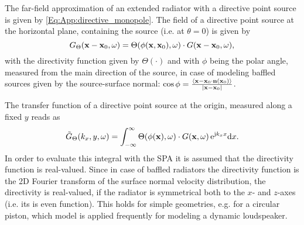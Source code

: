 The far-field approximation of an extended radiator with a directive point source is given by \eqref{Eq:App:directive_monopole}.
The field of a directive point source at the horizontal plane, containing the source (i.e. at $\theta = 0$) is given by
\begin{equation}
G_{\Theta}(\mathbf{x}-\mathbf{x}_0,\omega) = \Theta(\phi(\mathbf{x},\mathbf{x}_0),\omega) \cdot
G(\mathbf{x}-\mathbf{x}_0,\omega),
\end{equation}
with the directivity function given by $\Theta(\cdot)$ and with $\phi$ being the polar angle, measured from the main direction of the source, in case of modeling baffled sources given by the source-surface normal: $\cos \phi = \frac{\left< \mathbf{x}-\mathbf{x}_0 \cdot \mathbf{n}(\mathbf{x}_0) \right>}{|\mathbf{x}-\mathbf{x}_0|}$.

The transfer function of a directive point source at the origin, measured along a fixed $y$ reads as 
\begin{equation}
\tilde{G}_{\Theta}(k_x,y,\omega) = \int_{-\infty}^{\infty} \Theta(\phi(\mathbf{x}),\omega) \cdot
G(\mathbf{x},\omega) \, \mathrm{e}^{\mathrm{j} k_x x} \mathrm{d} x.
\end{equation}
In order to evaluate this integral with the SPA it is assumed that the directivity function is real-valued.
Since in case of baffled radiators the directivity function is the 2D Fourier transform of the surface normal velocity distribution, the directivity is real-valued, if the radiator is symmetrical both to the $x$- and $z$-axes (i.e. its is even function).
This holds for simple geometries, e.g. for a circular piston, which model is applied frequently for modeling a dynamic loudspeaker.

